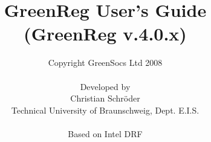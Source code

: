\documentclass[a4paper,12pt,oneside]{gsbook}
\author{Copyright GreenSocs Ltd 2008\\ \\Developed by\\Christian Schr\"oder\\Technical University of Braunschweig, Dept. E.I.S.\\ \\ Based on Intel DRF}
\title{GreenReg User's Guide\\(GreenReg v.4.0.x)}%
\begin{document}
\maketitle

\tableofcontents
\enlargethispage{\baselineskip} %





%
\end{document}
